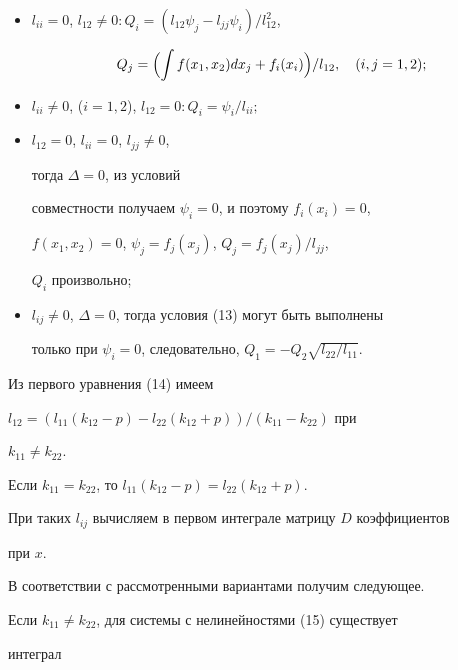 \begin{itemize}


\item[1.] $l_{ii}=0$, $l_{12}\ne 0:


Q_{i}=(l_{12}\psi _{j}- l_{jj}\psi _{i})/l_{12}^{2}$,


$$


Q_{j}=\Bigl(\int f(x_{1},x_{2})dx_{j}+f_{i}(x_{i})\Bigr)/l_{12},


\quad (i,j=1,2);


$$


\item[2.] $l_{ii}\ne 0$, ($i=1,2$), $l_{12}=0 : Q_{i}=\psi _{i}/l_{ii};$


\item[3.] $l_{12}=0$, $l_{ii}=0$, $l_{jj}\ne 0$,


тогда $\Delta =0$, из условий


совместности получаем $\psi _{i}=0$, и поэтому $f_{i}(x_{i})=0$,


$f(x_{1},x_{2})=0$, $\psi_{j}=f_{j}(x_{j})$, $Q_{j}=f_{j}(x_{j})/l_{jj}$,


$Q_{i}$ произвольно;


\item[4.] $l_{ij}\ne 0$, $\Delta =0$, тогда условия (13) могут быть выполнены


только при $\psi_{i}=0$, следовательно, $Q_{1}=-Q_{2}\sqrt {l_{22}/l_{11}}.$


\end{itemize}





Из первого уравнения (14) имеем


$l_{12}=(l_{11}(k_{12}-p)-l_{22}(k_{12}+p))/(k_{11}-k_{22})$ при


$k_{11}\ne k_{22}$.


Если $k_{11}=k_{22}$, то $l_{11}(k_{12}-p)=l_{22}(k_{12}+p).$


При таких $l_{ij}$ вычисляем в первом интеграле матрицу $D$ коэффициентов


при $x$.


В соответствии с рассмотренными вариантами получим следующее.





Если $k_{11}\ne k_{22}$, для системы с нелинейностями (15) существует


интеграл


